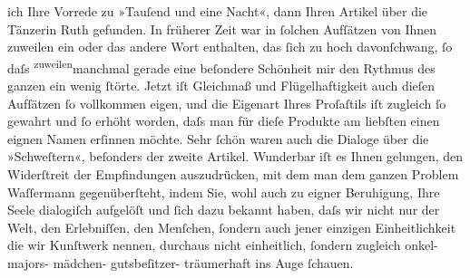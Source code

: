 \begin{ledgroupsized}[t]{13cm}
               ich Ihre Vorrede zu »Tauſend und eine Nacht«, dann Ihren Artikel über die Tänzerin Ruth gefunden. In früherer Zeit war in ſolchen Aufſätzen von
               Ihnen zuweilen ein oder das andere Wort enthalten, das ſich zu hoch davonſchwang, ſo
               daſs \substVorne{}\textsuperscript{zuweilen}{\allowbreak}\substDazwischen{}manchmal\substHinten{} gerade eine beſondere Schönheit mir den Rythmus des ganzen ein wenig ſtörte.
               Jetzt iſt Gleichmaß und {\pb}Flügelhaftigkeit auch dieſen
               Aufſätzen ſo vollkommen eigen,  und die
               Eigenart  Ihres Proſaſtils iſt zugleich ſo gewahrt
               und ſo erhöht worden, daſs man für dieſe Produkte am liebſten einen eignen Namen
               erſinnen möchte. Sehr ſchön waren auch die Dialoge über die »Schweſtern«, beſonders der zweite Artikel. Wunderbar iſt es Ihnen gelungen,
               den Widerſtreit der Empfindungen auszudrücken, mit dem man dem ganzen Problem {\pb}Waſſermann gegenüberſteht, indem Sie, wohl auch
               zu eigner Beruhigung, Ihre Seele dialogiſch aufgelöſt und ſich dazu bekannt haben,
               daſs wir nicht nur der Welt, den Erlebniſſen, den Menſchen, ſondern auch jener
               einzigen Einheitlichkeit die wir Kunſtwerk nennen, durchaus nicht einheitlich,
               ſondern zugleich onkel- majors- mädchen- gutsbeſitzer- träumerhaft ins Auge ſchauen.

\end{ledgroupsized}
